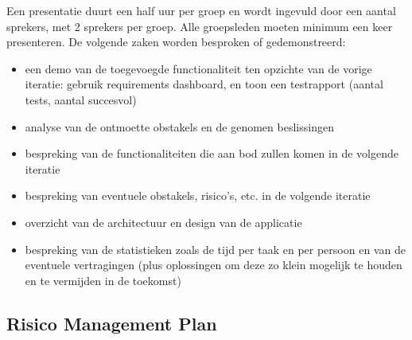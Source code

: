 Een presentatie duurt een half uur per groep en wordt ingevuld door een aantal sprekers, met 2 sprekers
per groep. Alle groepsleden moeten minimum een keer presenteren. De volgende zaken worden
besproken of gedemonstreerd:

\begin{itemize}
\item een demo van de toegevoegde functionaliteit ten opzichte van de vorige iteratie: gebruik requirements
dashboard, en toon een testrapport (aantal tests, aantal succesvol)
\item analyse van de ontmoette obstakels en de genomen beslissingen
\item bespreking van de functionaliteiten die aan bod zullen komen in de volgende iteratie
\item bespreking van eventuele obstakels, risico’s, etc. in de volgende iteratie
\item overzicht van de architectuur en design van de applicatie
\item bespreking van de statistieken zoals de tijd per taak en per persoon en van de eventuele vertragingen
(plus oplossingen om deze zo klein mogelijk te houden en te vermijden in de toekomst)
\end{itemize}

\subsection{Risico Management Plan}

